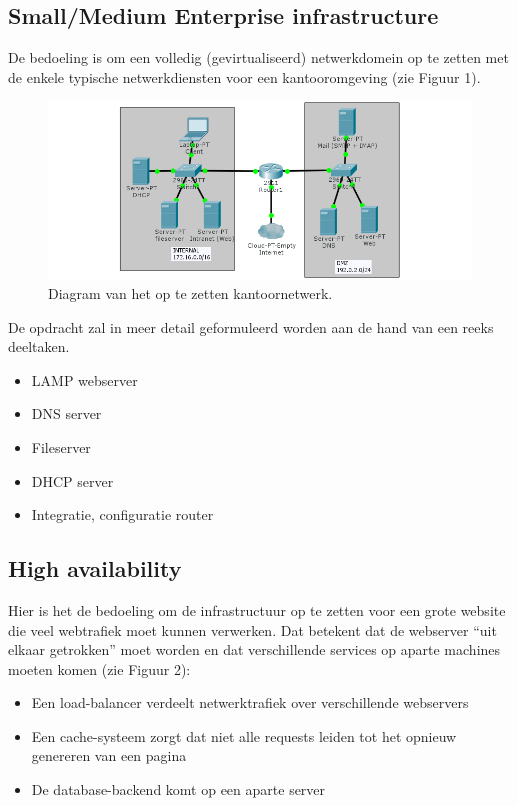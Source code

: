 \subsection{Small/Medium Enterprise infrastructure}
\label{subs:smallmedium-enterprise-infrastructure}

De bedoeling is om een volledig (gevirtualiseerd) netwerkdomein op te zetten met de enkele typische netwerkdiensten voor een kantooromgeving (zie Figuur 1).

\begin{figure}[htbp]
\centering
\includegraphics[width=\textwidth]{img/assignment-sme.png}
\caption{Diagram van het op te zetten kantoornetwerk.}
\end{figure}

De opdracht zal in meer detail geformuleerd worden aan de hand van een reeks deeltaken.

\begin{itemize}
\item LAMP webserver
\item DNS server
\item Fileserver
\item DHCP server
\item Integratie, configuratie router
\end{itemize}

\subsection{High availability}
\label{subs:high-availability}

Hier is het de bedoeling om de infrastructuur op te zetten voor een grote website die veel webtrafiek moet kunnen verwerken. Dat betekent dat de webserver ``uit elkaar getrokken'' moet worden en dat verschillende services op aparte machines moeten komen (zie Figuur 2):

\begin{itemize}
\item Een load-balancer verdeelt netwerktrafiek over verschillende webservers
\item Een cache-systeem zorgt dat niet alle requests leiden tot het opnieuw genereren van een pagina
\item De database-backend komt op een aparte server
\end{itemize}

